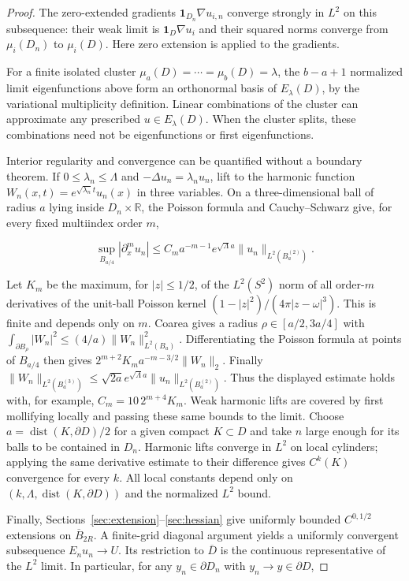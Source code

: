 \documentclass[11pt]{article}
\theoremstyle{definition}
\theoremstyle{remark}
\numberwithin{equation}{section}
\begin{document}
\begin{proof}
The zero-extended gradients $\mathbf1_{D_n}\nabla u_{i,n}$ converge strongly in $L^2$ on this subsequence: their weak limit is $\mathbf1_D\nabla u_i$ and their squared norms converge from $\mu_i(D_n)$ to $\mu_i(D)$. Here zero extension is applied to the gradients.

For a finite isolated cluster $\mu_a(D)=\cdots=\mu_b(D)=\lambda$, the $b-a+1$ normalized limit eigenfunctions above form an orthonormal basis of $E_\lambda(D)$, by the variational multiplicity definition. Linear combinations of the cluster can approximate any prescribed $u\in E_\lambda(D)$. When the cluster splits, these combinations need not be eigenfunctions or first eigenfunctions.

Interior regularity and convergence can be quantified without a boundary theorem. If $0\le\lambda_n\le\Lambda$ and $-\Delta u_n=\lambda_nu_n$, lift to the harmonic function $W_n(x,t)=e^{\sqrt{\lambda_n}t}u_n(x)$ in three variables. On a three-dimensional ball of radius $a$ lying inside $D_n\times\mathbb R$, the Poisson formula and Cauchy--Schwarz give, for every fixed multiindex order $m$,

\begin{equation}\label{eq:src-4-05}
\sup_{B_{a/4}}|\partial_x^m u_n|\le C_m a^{-m-1}e^{\sqrt\Lambda a}\|u_n\|_{L^2(B_a^{(2)})}.
\end{equation}

Let $K_m$ be the maximum, for $|z|\le1/2$, of the $L^2(S^2)$ norm of all order-$m$ derivatives of the unit-ball Poisson kernel $(1-|z|^2)/(4\pi|z-\omega|^3)$. This is finite and depends only on $m$. Coarea gives a radius $\rho\in[a/2,3a/4]$ with $\int_{\partial B_\rho}|W_n|^2\le(4/a)\|W_n\|_{L^2(B_a)}^2$. Differentiating the Poisson formula at points of $B_{a/4}$ then gives $2^{m+2}K_ma^{-m-3/2}\|W_n\|_2$. Finally $\|W_n\|_{L^2(B_a^{(3)})}\le\sqrt{2a}e^{\sqrt\Lambda a}\|u_n\|_{L^2(B_a^{(2)})}$. Thus the displayed estimate holds with, for example, $C_m=10\,2^{m+4}K_m$. Weak harmonic lifts are covered by first mollifying locally and passing these same bounds to the limit. Choose $a=\operatorname{dist}(K,\partial D)/2$ for a given compact $K\subset D$ and take $n$ large enough for its balls to be contained in $D_n$. Harmonic lifts converge in $L^2$ on local cylinders; applying the same derivative estimate to their difference gives $C^k(K)$ convergence for every $k$. All local constants depend only on $(k,\Lambda,\operatorname{dist}(K,\partial D))$ and the normalized $L^2$ bound.

Finally, Sections~\ref{sec:extension}--\ref{sec:hessian} give uniformly bounded $C^{0,1/2}$ extensions on $\overline B_{2R}$. A finite-grid diagonal argument yields a uniformly convergent subsequence $E_nu_n\to U$. Its restriction to $\overline D$ is the continuous representative of the $L^2$ limit. In particular, for any $y_n\in\partial D_n$ with $y_n\to y\in\partial D$,


\end{proof}
\end{document}
